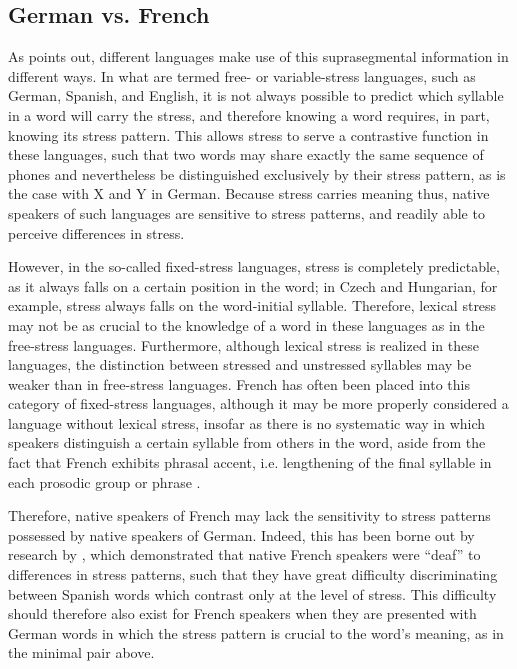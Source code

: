 		
		\subsection{German vs. French}
		
					As \textcite{Cutler2005} points out, different languages make use of this suprasegmental information in different ways. 
			In what are termed free- or variable-stress languages, such as German, Spanish, and English, it is not always possible to predict which syllable in a word will carry the stress, and therefore knowing a word requires, in part, knowing its stress pattern. This allows stress to serve a contrastive function in these languages, such that two words may share exactly the same sequence of phones and nevertheless be distinguished exclusively by their stress pattern, as is the case with X and Y in German. %
Because stress carries meaning thus, native speakers of such languages are sensitive to stress patterns, and readily able to perceive differences in stress. %

			However, in the so-called fixed-stress languages, stress is completely predictable, as it always falls on a certain position in the word; in Czech and Hungarian, for example, stress always falls on the word-initial syllable. Therefore, lexical stress may not be as crucial to the knowledge of a word in these languages as in the free-stress languages. Furthermore, although lexical stress is realized in these languages, the distinction between stressed and unstressed syllables may be weaker than in free-stress languages. French has often been placed into this category of fixed-stress languages, although it may be more properly considered a language without lexical stress, insofar as there is no systematic way in which speakers distinguish a certain syllable from others in the word, aside from the fact that French exhibits phrasal accent, i.e. lengthening of the final syllable in each prosodic group or phrase \citep{Dupoux2008}. %
			
		Therefore, native speakers of French may lack the sensitivity to stress patterns possessed by native speakers of German. Indeed, this has been borne out by research by \citeauthor{Dupoux2008} \citep{Peperkamp2002,Dupoux2001,Dupoux2008}, which demonstrated that native French speakers were ``deaf'' to differences in stress patterns, such that they have great difficulty discriminating between Spanish words which contrast only at the level of stress. This difficulty should therefore also exist for French speakers when they are presented with German words in which the stress pattern is crucial to the word's meaning, as in the minimal pair above.
		
